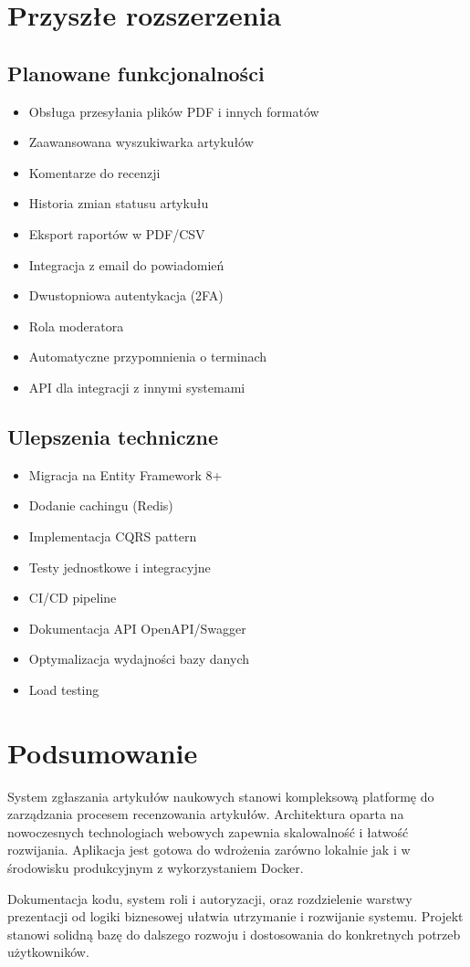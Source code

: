 \documentclass[times]{san}
\begin{document}
\section{Przyszłe rozszerzenia}

\subsection{Planowane funkcjonalności}

\begin{itemize}
    \item Obsługa przesyłania plików PDF i innych formatów
    \item Zaawansowana wyszukiwarka artykułów
    \item Komentarze do recenzji
    \item Historia zmian statusu artykułu
    \item Eksport raportów w PDF/CSV
    \item Integracja z email do powiadomień
    \item Dwustopniowa autentykacja (2FA)
    \item Rola moderatora
    \item Automatyczne przypomnienia o terminach
    \item API dla integracji z innymi systemami
\end{itemize}

\subsection{Ulepszenia techniczne}

\begin{itemize}
    \item Migracja na Entity Framework 8+
    \item Dodanie cachingu (Redis)
    \item Implementacja CQRS pattern
    \item Testy jednostkowe i integracyjne
    \item CI/CD pipeline
    \item Dokumentacja API OpenAPI/Swagger
    \item Optymalizacja wydajności bazy danych
    \item Load testing
\end{itemize}

\section{Podsumowanie}

System zgłaszania artykułów naukowych stanowi kompleksową platformę do zarządzania procesem recenzowania artykułów. Architektura oparta na nowoczesnych technologiach webowych zapewnia skalowalność i łatwość rozwijania. Aplikacja jest gotowa do wdrożenia zarówno lokalnie jak i w środowisku produkcyjnym z wykorzystaniem Docker.

Dokumentacja kodu, system roli i autoryzacji, oraz rozdzielenie warstwy prezentacji od logiki biznesowej ułatwia utrzymanie i rozwijanie systemu. Projekt stanowi solidną bazę do dalszego rozwoju i dostosowania do konkretnych potrzeb użytkowników.
\end{document}
